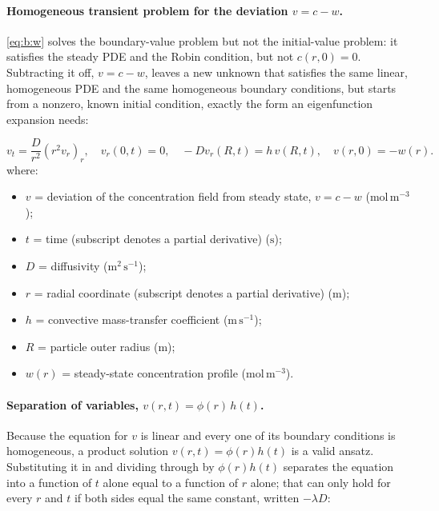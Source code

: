 \documentclass[11pt,a4paper]{article}
\begin{document}
\paragraph{Homogeneous transient problem for the deviation $v=c-w$.}
\cref{eq:b:w} solves the boundary-value problem but not the initial-value problem: it satisfies the steady PDE and the Robin condition, but not $c(r,0)=0$. Subtracting it off, $v=c-w$, leaves a new unknown that satisfies the same linear, homogeneous PDE and the same homogeneous boundary conditions, but starts from a nonzero, known initial condition, exactly the form an eigenfunction expansion needs:

\begin{equation}
v_t = \frac{D}{r^2}\left(r^2 v_r\right)_r, \quad
v_r(0,t)=0,\quad -Dv_r(R,t) = h\,v(R,t), \quad
v(r,0) = -w(r).
\label{eq:b:vproblem}
\end{equation}
\vspace{-0.3em}
\noindent where:

\begin{itemize}[leftmargin=1.6em,itemsep=1pt,topsep=3pt,parsep=0pt]
  \item $v$ = deviation of the concentration field from steady state, $v=c-w$ ($\mathrm{mol\,m^{-3}}$);
  \item $t$ = time (subscript denotes a partial derivative) ($\mathrm{s}$);
  \item $D$ = diffusivity ($\mathrm{m^{2}\,s^{-1}}$);
  \item $r$ = radial coordinate (subscript denotes a partial derivative) ($\mathrm{m}$);
  \item $h$ = convective mass-transfer coefficient ($\mathrm{m\,s^{-1}}$);
  \item $R$ = particle outer radius ($\mathrm{m}$);
  \item $w(r)$ = steady-state concentration profile ($\mathrm{mol\,m^{-3}}$).
\end{itemize}



\paragraph{Separation of variables, $v(r,t)=\phi(r)\,h(t)$.}
Because the equation for $v$ is linear and every one of its boundary conditions is homogeneous, a product solution $v(r,t)=\phi(r)h(t)$ is a valid ansatz. Substituting it in and dividing through by $\phi(r)h(t)$ separates the equation into a function of $t$ alone equal to a function of $r$ alone; that can only hold for every $r$ and $t$ if both sides equal the same constant, written $-\lambda D$:
\end{document}
